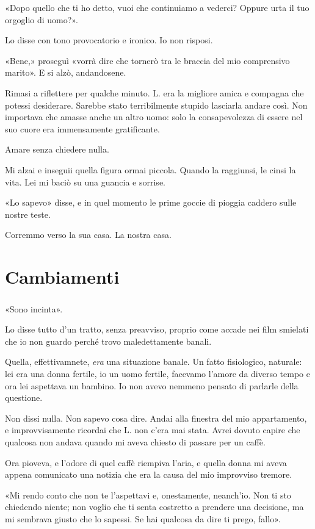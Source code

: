 \documentclass[a4paper,12pt]{book}
\begin{document}
«Dopo quello che ti ho detto, vuoi che continuiamo a vederci? Oppure urta il tuo
orgoglio di uomo?».

Lo disse con tono provocatorio e ironico. Io non risposi.

«Bene,» proseguì «vorrà dire che tornerò tra le braccia del mio comprensivo
marito». E si alzò, andandosene.

Rimasi a riflettere per qualche minuto. L. era la migliore amica e compagna che
potessi desiderare. Sarebbe stato terribilmente stupido lasciarla andare così.
Non importava che amasse anche un altro uomo: solo la consapevolezza di essere
nel suo cuore era immensamente gratificante.

Amare senza chiedere nulla.

Mi alzai e inseguii quella figura ormai piccola. Quando la raggiunsi, le cinsi
la vita. Lei mi baciò su una guancia e sorrise.

«Lo sapevo» disse, e in quel momento le prime goccie di pioggia caddero sulle
nostre teste.

Corremmo verso la sua casa. La nostra casa.

\chapter{Cambiamenti}

\paragraph{}
«Sono incinta».

Lo disse tutto d'un tratto, senza preavviso, proprio come accade nei film
smielati che io non guardo perché trovo maledettamente banali.

Quella, effettivamnete, \emph{era} una situazione banale. Un fatto fisiologico,
naturale: lei era una donna fertile, io un uomo fertile, facevamo l'amore da
diverso tempo e ora lei aspettava un bambino. Io non avevo nemmeno pensato di
parlarle della questione.

Non dissi nulla. Non sapevo cosa dire. Andai alla finestra del mio appartamento,
e improvvisamente ricordai che L. non c'era mai stata. Avrei dovuto capire che
qualcosa non andava quando mi aveva chiesto di passare per un caffè.

Ora pioveva, e l'odore di quel caffè riempiva l'aria, e quella donna mi aveva
appena comunicato una notizia che era la causa del mio improvviso tremore.

«Mi rendo conto che non te l'aspettavi e, onestamente, neanch'io. Non ti sto
chiedendo niente; non voglio che ti senta costretto a prendere una decisione,
ma mi sembrava giusto che lo sapessi. Se hai qualcosa da dire ti prego, fallo».
\end{document}

